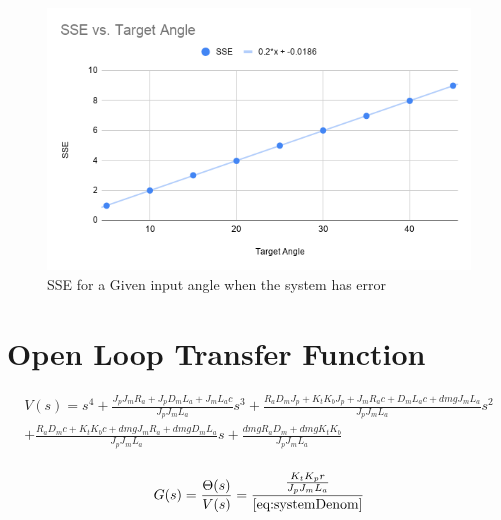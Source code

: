 \documentclass[a4paper, 11pt, compsoc]{IEEEtran}
\begin{document}
			\begin{figure}[!ht]
				\centering
				\includegraphics[width=0.8\columnwidth]{lab4SSEvsTarget Angle.png}
				\caption{SSE for a Given input angle when the system has error}
				\label{fig:lab4SSE}
			\end{figure}

		\section{Open Loop Transfer Function}\label{app:oltf}
			\begin{equation}
				\label{eq:systemDenom}
				\begin{aligned}
					V(s) = s^4 + \frac{ J_pJ_mR_a + J_pD_mL_a + J_mL_ac }{J_pJ_mL_a}s^3 + \frac{R_aD_mJ_p + K_tK_bJ_p + J_mR_ac + D_mL_ac + dmgJ_mL_a}{J_pJ_mL_a}s^2\\
					+ \frac{R_aD_mc + K_tK_bc + dmgJ_mR_a + dmgD_mL_a}{J_pJ_mL_a}s + \frac{dmgR_aD_m + dmgK_tK_b}{J_pJ_mL_a}\\
				\end{aligned}
			\end{equation}

			\begin{equation}
				\label{eq:fullTF}
				\begin{aligned}
					G(s) = \frac{\Theta(s)}{V(s)} = \frac{ \frac{K_tK_pr}{J_pJ_mL_a} }{ \cref{eq:systemDenom} }
				\end{aligned}
			\end{equation}
\end{document}
